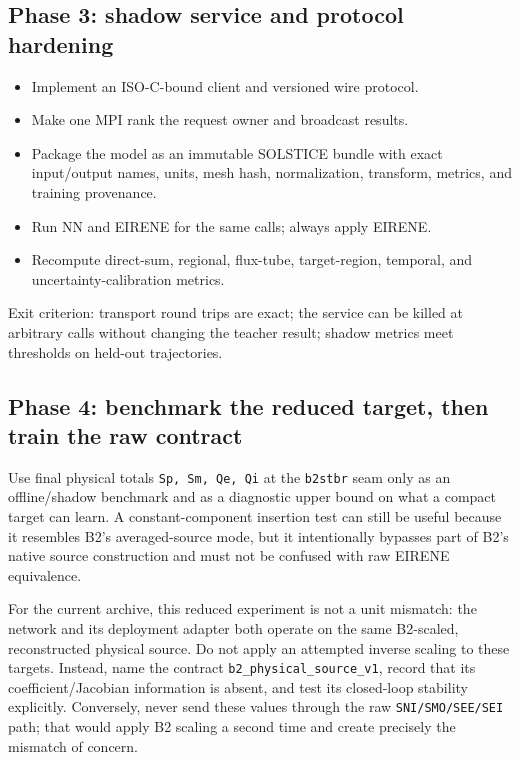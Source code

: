 \documentclass[11pt]{article}
\begin{document}
\subsection{Phase 3: shadow service and protocol hardening}

\begin{itemize}
\item Implement an ISO-C-bound client and versioned wire protocol.
\item Make one MPI rank the request owner and broadcast results.
\item Package the model as an immutable SOLSTICE bundle with exact input/output names, units, mesh hash, normalization, transform, metrics, and training provenance.
\item Run NN and EIRENE for the same calls; always apply EIRENE.
\item Recompute direct-sum, regional, flux-tube, target-region, temporal, and uncertainty-calibration metrics.
\end{itemize}

Exit criterion: transport round trips are exact; the service can be killed at arbitrary calls without changing the teacher result; shadow metrics meet thresholds on held-out trajectories.

\subsection{Phase 4: benchmark the reduced target, then train the raw contract}

Use final physical totals \texttt{Sp, Sm, Qe, Qi} at the \texttt{b2stbr} seam only as an offline/shadow benchmark and as a diagnostic upper bound on what a compact target can learn. A constant-component insertion test can still be useful because it resembles B2's averaged-source mode, but it intentionally bypasses part of B2's native source construction and must not be confused with raw EIRENE equivalence.

For the current archive, this reduced experiment is not a unit mismatch: the network and its deployment adapter both operate on the same B2-scaled, reconstructed physical source. Do not apply an attempted inverse scaling to these targets. Instead, name the contract \texttt{b2\_physical\_source\_v1}, record that its coefficient/Jacobian information is absent, and test its closed-loop stability explicitly. Conversely, never send these values through the raw \texttt{SNI/SMO/SEE/SEI} path; that would apply B2 scaling a second time and create precisely the mismatch of concern.
\end{document}
